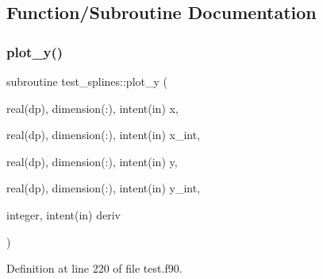 \subsection{Function/\+Subroutine Documentation}
\mbox{\label{test_8f90_a197914f99b7e194fb4bca9ca3669e0e8}} 
\subsubsection{\texorpdfstring{plot\+\_\+y()}{plot\_y()}}
{\footnotesize\ttfamily subroutine test\+\_\+splines\+::plot\+\_\+y (\begin{DoxyParamCaption}\item[{real(dp), dimension(\+:), intent(in)}]{x,  }\item[{real(dp), dimension(\+:), intent(in)}]{x\+\_\+int,  }\item[{real(dp), dimension(\+:), intent(in)}]{y,  }\item[{real(dp), dimension(\+:), intent(in)}]{y\+\_\+int,  }\item[{integer, intent(in)}]{deriv }\end{DoxyParamCaption})}



Definition at line 220 of file test.\+f90.

